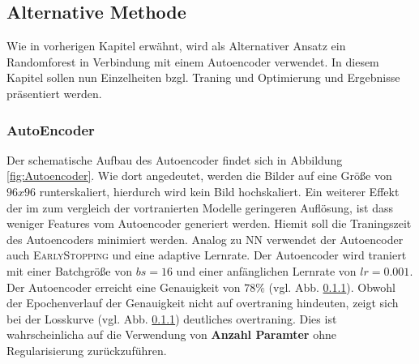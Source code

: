 \subsection{Alternative Methode}
Wie in vorherigen Kapitel erwähnt, wird als Alternativer Ansatz ein Randomforest
in Verbindung mit einem Autoencoder verwendet. In diesem Kapitel sollen nun
Einzelheiten bzgl. Traning und Optimierung und Ergebnisse präsentiert werden.

\subsubsection{AutoEncoder}
Der schematische Aufbau des Autoencoder findet sich in Abbildung \ref{fig:Autoencoder}.
Wie dort angedeutet, werden die Bilder auf eine Größe von $96x96$ runterskaliert,
hierdurch wird kein Bild hochskaliert. Ein weiterer Effekt der im zum vergleich
der vortranierten Modelle geringeren Auflösung, ist dass weniger Features
vom Autoencoder generiert werden. Hiemit soll die Traningszeit des Autoencoders
minimiert werden. Analog zu NN verwendet der Autoencoder auch \textsc{EarlyStopping}
und eine adaptive Lernrate. Der Autoencoder wird traniert mit einer Batchgröße
von $bs=16$ und einer anfänglichen Lernrate von $lr=0.001$. Der Autoencoder
erreicht eine Genauigkeit von $78\%$ (vgl. Abb. \ref{}). Obwohl der Epochenverlauf
der Genauigkeit nicht auf overtraning hindeuten, zeigt sich bei der Losskurve
(vgl. Abb. \ref{}) deutliches overtraning. Dies ist wahrscheinlicha auf die
Verwendung von \textbf{Anzahl Paramter} ohne Regularisierung zurückzuführen.

